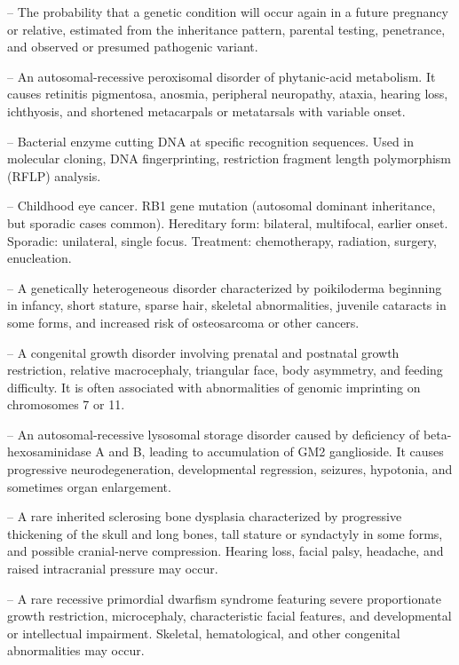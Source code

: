 -- The probability that a genetic condition will occur again in a future pregnancy or relative, estimated from the inheritance pattern, parental testing, penetrance, and observed or presumed pathogenic variant.

-- An autosomal-recessive peroxisomal disorder of phytanic-acid metabolism. It causes retinitis pigmentosa, anosmia, peripheral neuropathy, ataxia, hearing loss, ichthyosis, and shortened metacarpals or metatarsals with variable onset.

-- Bacterial enzyme cutting DNA at specific recognition sequences. Used in molecular cloning, DNA fingerprinting, restriction fragment length polymorphism (RFLP) analysis.

-- Childhood eye cancer. RB1 gene mutation (autosomal dominant inheritance, but sporadic cases common). Hereditary form: bilateral, multifocal, earlier onset. Sporadic: unilateral, single focus. Treatment: chemotherapy, radiation, surgery, enucleation.

-- A genetically heterogeneous disorder characterized by poikiloderma beginning in infancy, short stature, sparse hair, skeletal abnormalities, juvenile cataracts in some forms, and increased risk of osteosarcoma or other cancers.

-- A congenital growth disorder involving prenatal and postnatal growth restriction, relative macrocephaly, triangular face, body asymmetry, and feeding difficulty. It is often associated with abnormalities of genomic imprinting on chromosomes 7 or 11.

-- An autosomal-recessive lysosomal storage disorder caused by deficiency of beta-hexosaminidase A and B, leading to accumulation of GM2 ganglioside. It causes progressive neurodegeneration, developmental regression, seizures, hypotonia, and sometimes organ enlargement.

-- A rare inherited sclerosing bone dysplasia characterized by progressive thickening of the skull and long bones, tall stature or syndactyly in some forms, and possible cranial-nerve compression. Hearing loss, facial palsy, headache, and raised intracranial pressure may occur.

-- A rare recessive primordial dwarfism syndrome featuring severe proportionate growth restriction, microcephaly, characteristic facial features, and developmental or intellectual impairment. Skeletal, hematological, and other congenital abnormalities may occur.

